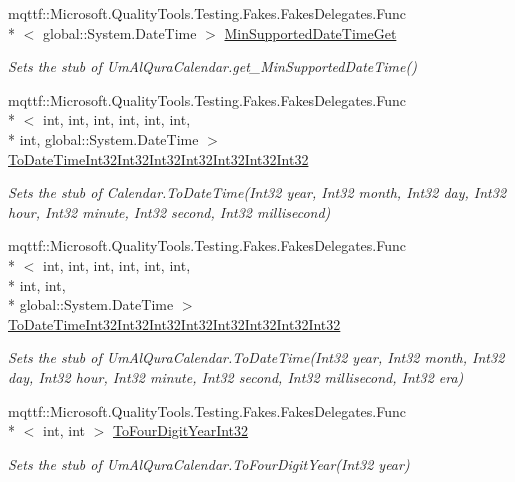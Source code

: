 \begin{DoxyCompactItemize}
mqttf\-::\-Microsoft.\-Quality\-Tools.\-Testing.\-Fakes.\-Fakes\-Delegates.\-Func\\*
$<$ global\-::\-System.\-Date\-Time $>$ \hyperlink{class_system_1_1_globalization_1_1_fakes_1_1_stub_um_al_qura_calendar_a8b493e7ef4adf5c4aabe682572a32d50}{Min\-Supported\-Date\-Time\-Get}
\begin{DoxyCompactList}\small\item\em Sets the stub of Um\-Al\-Qura\-Calendar.\-get\-\_\-\-Min\-Supported\-Date\-Time()\end{DoxyCompactList}\item 
mqttf\-::\-Microsoft.\-Quality\-Tools.\-Testing.\-Fakes.\-Fakes\-Delegates.\-Func\\*
$<$ int, int, int, int, int, int, \\*
int, global\-::\-System.\-Date\-Time $>$ \hyperlink{class_system_1_1_globalization_1_1_fakes_1_1_stub_um_al_qura_calendar_a6aa8ef32382605055624034b852dc95a}{To\-Date\-Time\-Int32\-Int32\-Int32\-Int32\-Int32\-Int32\-Int32}
\begin{DoxyCompactList}\small\item\em Sets the stub of Calendar.\-To\-Date\-Time(\-Int32 year, Int32 month, Int32 day, Int32 hour, Int32 minute, Int32 second, Int32 millisecond)\end{DoxyCompactList}\item 
mqttf\-::\-Microsoft.\-Quality\-Tools.\-Testing.\-Fakes.\-Fakes\-Delegates.\-Func\\*
$<$ int, int, int, int, int, int, \\*
int, int, \\*
global\-::\-System.\-Date\-Time $>$ \hyperlink{class_system_1_1_globalization_1_1_fakes_1_1_stub_um_al_qura_calendar_a3cd9200cf3b2158c0eeb42f3ab978739}{To\-Date\-Time\-Int32\-Int32\-Int32\-Int32\-Int32\-Int32\-Int32\-Int32}
\begin{DoxyCompactList}\small\item\em Sets the stub of Um\-Al\-Qura\-Calendar.\-To\-Date\-Time(\-Int32 year, Int32 month, Int32 day, Int32 hour, Int32 minute, Int32 second, Int32 millisecond, Int32 era)\end{DoxyCompactList}\item 
mqttf\-::\-Microsoft.\-Quality\-Tools.\-Testing.\-Fakes.\-Fakes\-Delegates.\-Func\\*
$<$ int, int $>$ \hyperlink{class_system_1_1_globalization_1_1_fakes_1_1_stub_um_al_qura_calendar_ae86bbc5282be42f51fdb859876ba4edc}{To\-Four\-Digit\-Year\-Int32}
\begin{DoxyCompactList}\small\item\em Sets the stub of Um\-Al\-Qura\-Calendar.\-To\-Four\-Digit\-Year(\-Int32 year)\end{DoxyCompactList}\item 

\end{DoxyCompactItemize}

